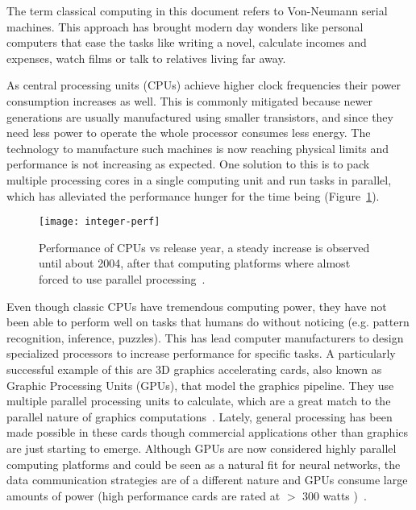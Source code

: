 The term classical computing in this document refers to Von-Neumann serial machines. This approach has brought modern day wonders like personal computers that ease the tasks like writing a novel, calculate incomes and expenses, watch films or talk to relatives living far away. 

As central processing units (CPUs) achieve higher clock frequencies their power consumption increases as well. This is commonly mitigated because newer generations are usually manufactured using smaller transistors, and since they need less power to operate the whole processor consumes less energy. The technology to manufacture such machines is now reaching physical limits and performance is not increasing as expected. One solution to this is to pack multiple processing cores in a single computing unit and run tasks in parallel, which has alleviated the performance hunger for the time being (Figure~\ref{fig:comp:moore}). 

\begin{figure}[h]
  \begin{center}
    \texttt{[image: integer-perf]}
    \caption{Performance of CPUs vs release year, a steady increase is observed until about 2004, after that computing platforms where almost forced to use parallel processing~\cite{int-perf-images}. }
    \label{fig:comp:moore}
  \end{center}
\end{figure}

Even though classic CPUs have tremendous computing power, they have not been able to perform well on tasks that humans do without noticing (e.g. pattern recognition, inference, puzzles). This has lead computer manufacturers to design specialized processors to increase performance for specific tasks. A particularly successful example of this are 3D graphics accelerating cards, also known as Graphic Processing Units (GPUs), that model the graphics pipeline. They use multiple parallel processing units to calculate, which are a great match to the parallel nature of graphics computations~\cite{nickolls2010gpu,chen2009gpu}. Lately, general processing has been made possible in these cards though commercial applications other than graphics are just starting to emerge. Although GPUs are now considered highly parallel computing platforms and could be seen as a natural fit for neural networks, the data communication strategies are of a different nature and GPUs consume large amounts of power (high performance cards are rated at $>$ 300 watts )~\cite{nvidia, amd}.


